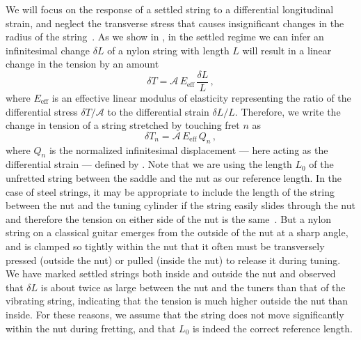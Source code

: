 We will focus on the response of a settled string to a differential longitudinal strain, and neglect the transverse stress that causes insignificant changes in the radius of the string~\cite{ref:lynchaird2017mpn}. As we show in , in the settled regime we can infer an infinitesimal change $\delta L$ of a nylon string with length $L$ will result in a linear change in the tension by an amount~\cite{ref:landau1986toe}
\begin{equation} \label{eqn:youngs_mod_def}
  \delta T = \mathcal{A}\, E_\mathrm{eff}\, \frac{\delta L}{L}\, ,
\end{equation}
where $E_\mathrm{eff}$ is an effective linear modulus of elasticity representing the ratio of the differential stress $\delta T / \mathcal{A}$ to the differential strain $\delta L / L$. Therefore, we write the change in tension of a string stretched by touching fret $n$ as
 \begin{equation} \label{eqn:delta_t_n}
\delta T_n = \mathcal{A}\, E_\mathrm{eff}\, Q_n\, ,
 \end{equation}
where $Q_n$ is the normalized infinitesimal displacement --- here acting as the differential strain --- defined by . Note that we are using the length $L_0$ of the unfretted string between the saddle and the nut as our reference length. In the case of steel strings, it may be appropriate to include the length of the string between the nut and the tuning cylinder if the string easily slides through the nut and therefore the tension on either side of the nut is the same~\cite{ref:kemp2020ibg}. But a nylon string on a classical guitar emerges from the outside of the nut at a sharp angle, and is clamped so tightly within the nut that it often must be transversely pressed (outside the nut) or pulled (inside the nut) to release it during tuning. We have marked settled strings both inside and outside the nut and observed that $\delta L$ is about twice as large between the nut and the tuners than that of the vibrating string, indicating that the tension is much higher outside the nut than inside. For these reasons, we assume that the string does not move significantly within the nut during fretting, and that $L_0$ is indeed the correct reference length. 

